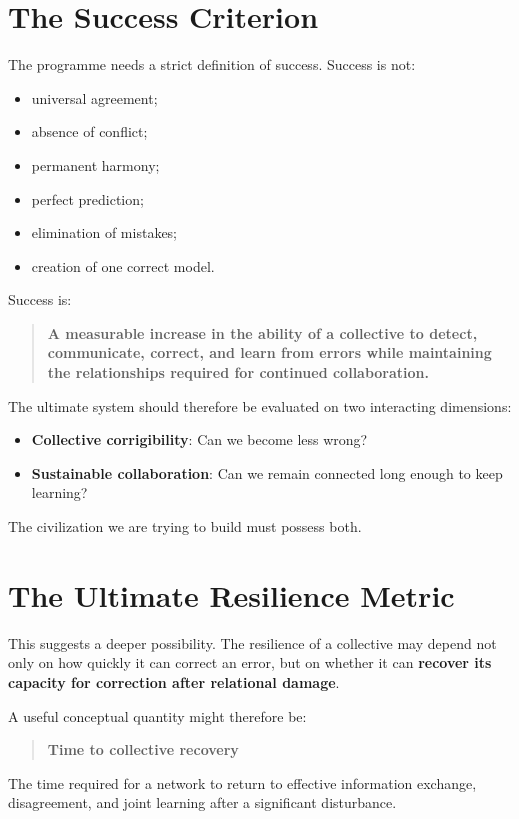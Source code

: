 \documentclass{article}
\begin{document}
\section{The Success Criterion}
The programme needs a strict definition of success. Success is not:
\begin{itemize}
    \item universal agreement;
    \item absence of conflict;
    \item permanent harmony;
    \item perfect prediction;
    \item elimination of mistakes;
    \item creation of one correct model.
\end{itemize}

Success is:
\begin{quote}
    \textbf{A measurable increase in the ability of a collective to detect, communicate, correct, and learn from errors while maintaining the relationships required for continued collaboration.}
\end{quote}

The ultimate system should therefore be evaluated on two interacting dimensions:
\begin{itemize}
    \item \textbf{Collective corrigibility}: Can we become less wrong?
    \item \textbf{Sustainable collaboration}: Can we remain connected long enough to keep learning?
\end{itemize}

The civilization we are trying to build must possess both.

\section{The Ultimate Resilience Metric}
This suggests a deeper possibility. The resilience of a collective may depend not only on how quickly it can correct an error, but on whether it can \textbf{recover its capacity for correction after relational damage}.

A useful conceptual quantity might therefore be:
\begin{quote}
    \textbf{Time to collective recovery}
\end{quote}
The time required for a network to return to effective information exchange, disagreement, and joint learning after a significant disturbance.
\end{document}

